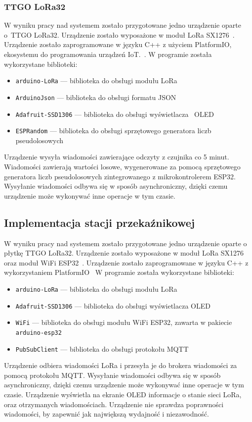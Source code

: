 \subsubsection{TTGO LoRa32}
W wyniku pracy nad systemem zostało przygotowane jedno urządzenie oparte o~TTGO LoRa32. Urządzenie zostało wyposażone w moduł LoRa SX1276~\cite{ESP32:sx1276-doc}. Urządzenie zostało zaprogramowane w języku C++ z użyciem PlatformIO, ekosystemu do programowania urządzeń IoT.~\cite{tool:pio}. W programie została wykorzystane biblioteki:
\begin{itemize}
    \item \texttt{arduino-LoRa} — biblioteka do obsługi modułu LoRa
          ~\cite{ESP32:lora-lib}
    \item \texttt{ArduinoJson} — biblioteka do obsługi formatu JSON~\cite{ESP32:ArduinoJson}
    \item \texttt{Adafruit-SSD1306} — biblioteka do obsługi wyświetlacza~\cite{ESP32:Adafruit-SSD1306} OLED
    \item \texttt{ESPRandom} — biblioteka do obsługi sprzętowego generatora liczb pseudolosowych~\cite{ESP32:ESPRandom}
\end{itemize}
Urządzenie wysyła wiadomości zawierające odczyty z czujnika co 5 minut. Wiadomości zawierają wartości losowe, wygenerowane za pomocą sprzętowego generatora liczb pseudolosowych zintegrowanego z mikrokontrolerem ESP32.  Wysyłanie wiadomości odbywa się w sposób asynchroniczny, dzięki czemu urządzenie może wykonywać inne operacje w tym czasie.

\subsection{Implementacja stacji przekaźnikowej}
W wyniku pracy nad systemem zostało przygotowane jedno urządzenie oparte o płytkę TTGO LoRa32. Urządzenie zostało wyposażone w moduł LoRa SX1276~\cite{ESP32:sx1276-doc} oraz moduł WiFi ESP32~\cite{ESP32:datasheet}. Urządzenie zostało zaprogramowane w języku C++ z wykorzystaniem PlatformIO~\cite{tool:pio} W programie została wykorzystane biblioteki:
\begin{itemize}
    \item \texttt{arduino-LoRa} — biblioteka do obsługi modułu LoRa~\cite{ESP32:lora-lib}

    \item \texttt{Adafruit-SSD1306} — biblioteka do obsługi wyświetlacza OLED~\cite{ESP32:Adafruit-SSD1306}
    \item \texttt{WiFi} — biblioteka do obsługi modułu WiFi ESP32, zawarta w pakiecie \texttt{arduino-esp32}~\cite{ESP32:Arduino}
    \item \texttt{PubSubClient} — biblioteka do obsługi protokołu MQTT~\cite{ESP32:PubSubClient}
\end{itemize}
Urządzenie odbiera wiadomości LoRa i przesyła je do brokera wiadomości za pomocą protokołu MQTT. Wysyłanie wiadomości odbywa się w sposób asynchroniczny, dzięki czemu urządzenie może wykonywać inne operacje w tym czasie. Urządzenie wyświetla na ekranie OLED informacje o stanie sieci LoRa, oraz otrzymanych wiadomościach. Urządzenie nie sprawdza poprawności wiadomości, by zapewnić jak największą wydajność i niezawodność.

